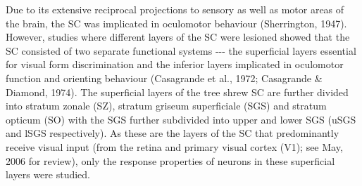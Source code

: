 Due to its extensive reciprocal projections to sensory as well as motor
areas of the brain, the SC was implicated in oculomotor behaviour
(Sherrington, 1947). However, studies where different layers of the SC
were lesioned showed that the SC consisted of two separate functional
systems -\/-\/- the superficial layers essential for visual form
discrimination and the inferior layers implicated in oculomotor function
and orienting behaviour (Casagrande et al., 1972; Casagrande \& Diamond,
1974). The superficial layers of the tree shrew SC are further divided
into stratum zonale (SZ), stratum griseum superficiale (SGS) and stratum
opticum (SO) with the SGS further subdivided into upper and lower SGS
(uSGS and lSGS respectively). As these are the layers of the SC that
predominantly receive visual input (from the retina and primary visual
cortex (V1); see May, 2006 for review), only the response properties of
neurons in these superficial layers were studied.

